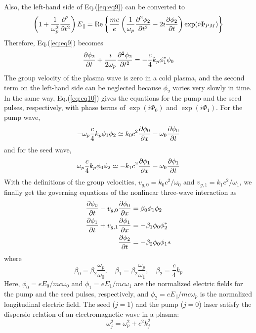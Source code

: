 \documentclass{article}
\begin{document}
    Also, the left-hand side of Eq.(\ref{eq:eq9}) can be converted to
    \begin{equation}
        \left( 1 + \frac{1}{\omega_p^2}\pdv[2]{t} \right)E_{\parallel} = \Re\left\{ \frac{mc}{e}\left(\frac{1}{\omega_p}\pdv[2]{\phi_2}{t} - 2i\pdv{\phi_2}{t} \right)\exp(i\Phi_{PM}) \right\}
    \end{equation}
    Therefore, Eq.(\ref{eq:eq9}) becomes
    \begin{equation}
        \pdv{\phi_2}{t} + \frac{i}{2\omega_p}\pdv[2]{\phi_2}{t} = -\frac{c}{4}k_p\phi_1^*\phi_0
    \end{equation}
    The group velocity of the plasma wave is zero in a cold plasma, and the second term on the left-hand side can be neglected because $\phi_2$ varies very slowly in time.
    In the same way, Eq.(\ref{eq:eq10}) gives the equations for the pump and the seed pulses, respectively, with phase terms of $\exp(i\Phi_0)$ and $\exp(i\Phi_1)$. For the pump wave,
    \begin{equation}
        -\omega_p\frac{c}{4}k_p\phi_1\phi_2 \simeq k_0c^2\pdv{\phi_0}{x} - \omega_0\pdv{\phi_0}{t}
    \end{equation}
    and for the seed wave,
    \begin{equation}
        \omega_p\frac{c}{4}k_p\phi_0\phi_2 \simeq -k_1c^2\pdv{\phi_1}{x} - \omega_0\pdv{\phi_1}{t}
    \end{equation}
    With the definitions of the group velocities, $v_{g,0}=k_0c^2/\omega_0$ and $v_{g,1}=k_1c^2/\omega_1$, we finally get the governing equations of the nonlinear three-wave interaction as \cite{lee_solitary_2003}
    \begin{equation} \label{eq:three_wave_interaction}
        \begin{aligned}
            \pdv{\phi_0}{t} - v_{g,0}\pdv{\phi_0}{x} &= \beta_0\phi_1\phi_2 \\
            \pdv{\phi_1}{t} + v_{g,1}\pdv{\phi_1}{x} &= -\beta_1\phi_0\phi_2^* \\
            \pdv{\phi_2}{t} &= -\beta_2\phi_0\phi_1* 
        \end{aligned}
    \end{equation}
    where 
    \begin{equation} \label{eq:coupling_coefficients}
        \beta_0=\beta_2\frac{\omega_p}{\omega_0}, \quad
        \beta_1=\beta_2\frac{\omega_p}{\omega_1}, \quad
        \beta_2=\frac{c}{4}k_p
    \end{equation}
    Here, $\phi_0 = eE_0/mc\omega_0$ and $\phi_1=eE_1/mc\omega_1$ are the normalized electric fields for the pump and the seed pulses, respectively, and $\phi_2=eE_{\parallel}/mc\omega_p$ is the normalized longitudinal electric field. The seed ($j=1$) and the pump ($j=0$) laser satisfy the dispersio relation of an electromagnetic wave in a plasma:
    \begin{equation}
        \omega_j^2 = \omega_p^2 + c^2k_j^2
    \end{equation}
\end{document}
